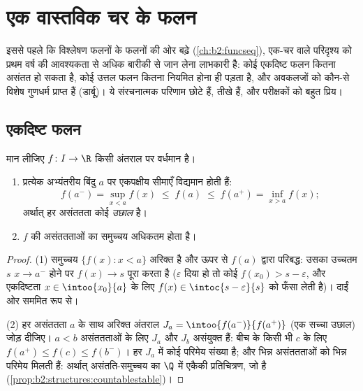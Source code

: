 \chapter{एक वास्तविक चर के फलन}\label{ch:b2:realfun}

इससे पहले कि विश्लेषण फलनों के फलनों की ओर बढ़े (\cref{ch:b2:funcseq}), एक-चर वाले
परिदृश्य को प्रथम वर्ष की आवश्यकता से अधिक बारीकी से जान लेना लाभकारी
है: कोई एकदिष्ट फलन कितना असंतत हो सकता है, कोई उत्तल फलन कितना नियमित
होना ही पड़ता है, और अवकलजों को कौन-से विशेष गुणधर्म प्राप्त हैं
(डार्बू)। ये संरचनात्मक परिणाम छोटे हैं, तीखे हैं, और परीक्षकों को बहुत
प्रिय।

\section{एकदिष्ट फलन}

\begin{theorem}\label{thm:b2:realfun:monotone}
मान लीजिए $f \colon I \to \R$ किसी अंतराल पर वर्धमान है।
\begin{enumerate}
  \item प्रत्येक अभ्यंतरीय बिंदु $a$ पर एकपक्षीय सीमाएँ विद्यमान होती
        हैं:
        \[
        f(a^-) = \sup_{x < a} f(x) \;\leq\; f(a) \;\leq\;
        f(a^+) = \inf_{x > a} f(x) ;
        \]
        अर्थात् हर असंततता कोई \emph{उछाल} है।
  \item $f$ की असंततताओं का समुच्चय अधिकतम  होता
        है।
\end{enumerate}
\end{theorem}

\begin{proof}
(1) समुच्चय $\{f(x) : x < a\}$ अरिक्त है और ऊपर से $f(a)$ द्वारा परिबद्ध: उसका उच्चतम $s$
$x \to a^-$ होने पर $f(x) \to s$ पूरा करता है ($\varepsilon$ दिया हो तो कोई $f(x_0) > s - \varepsilon$, और एकदिष्टता $x \in
\intoo{x_0}{a}$
के लिए $f(x) \in \intoc{s - \varepsilon}{s}$ को फँसा लेती है)। दाईं ओर सममित रूप से।

(2) हर असंततता $a$ के साथ अरिक्त  अंतराल $J_a = \intoo{f(a^-)}{f(a^+)}$ (एक सच्चा उछाल) जोड़
दीजिए। $a < b$ असंततताओं के लिए $J_a$ और $J_b$ असंयुक्त हैं: बीच के किसी भी $c$
के लिए $f(a^+) \leq f(c)
\leq f(b^-)$। हर $J_a$ में कोई परिमेय संख्या है; और भिन्न असंततताओं को भिन्न
परिमेय मिलती हैं: अर्थात् असंतति-समुच्चय का $\Q$ में एकैकी प्रतिचित्रण,
जो  है (\cref{prop:b2:structures:countablestable})।
\end{proof}

